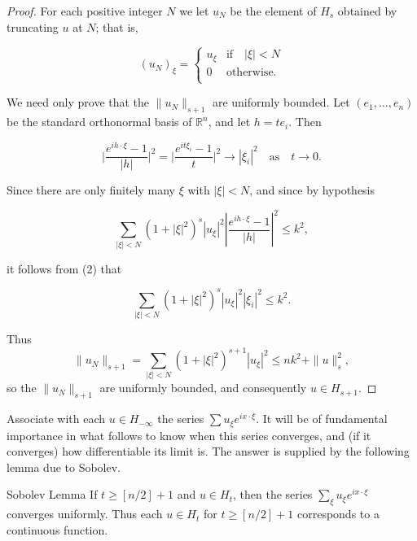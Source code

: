 \begin{proof}
For each positive integer $N$ we let  $ u_{N} $ be the element of  $ H_{s} $ obtained by truncating $u$ at $N$; that is,

\begin{equation}
\tag{1}\label{eq:6.20:1}
(u_{N})_{\xi}=\left\{\begin{matrix}{u_{\xi}}&{\mathrm{if}\quad|\xi|<N}\\ {0}&{\mathrm{otherwise}.}\\ \end{matrix}\right.
\end{equation}

We need only prove that the  $ \|u_N\|_{s+1} $ are uniformly bounded. Let  $ (e_1, \ldots, e_n) $ be the standard orthonormal basis of  $ \mathbb{R}^n $, and let  $ h = te_i $. Then

\begin{equation}
\tag{2}\label{eq:6.20:2}
\bigg|\frac{e^{i h\cdot\xi}-1}{|h|}\bigg|^{2}=\bigg|\frac{e^{i t\xi_{i}}-1}{t}\bigg|^{2}\to|\xi_{i}|^{2}\quad\text{as}\quad t\to0.
\end{equation}

Since there are only finitely many  $ \xi $ with  $ |\xi| < N $, and since by hypothesis

\[
\sum_{|\xi|<N}(1+|\xi|^{2})^{s}\left|u_{\xi}\right|^{2}\left|\frac{e^{i h\cdot\xi}-1}{|h|}\right|^{2}\leq k^{2},
\]

it follows from (2) that

\[
\sum_{|\xi|<N}(1+|\xi|^{2})^{s}\left|u_{\xi}\right|^{2}|\xi_{i}|^{2}\leq k^{2}.
\]

Thus
\[
\|u_{N}\|_{s+1}=\sum_{|\xi|<N}(1+|\xi|^{2})^{s+1}|u_{\xi}|^{2}\leq nk^{2}+\|u\|_{s}^{2},
\]
so the  $ \|u_N\|_{s+1} $ are uniformly bounded, and consequently  $ u \in H_{s+1} $.
\end{proof}

\label{thm:6.21} Associate with each $u \in H_{-\infty}$ the series $\sum u_{\xi} e^{ix \cdot \xi}$. It will be of fundamental importance in what follows to know when this series converges, and (if it converges) how differentiable its limit is. The answer is supplied by the following lemma due to Sobolev.

\begin{lemma}{Sobolev Lemma}\label{thm:6.22}
If $t \geq [n/2] + 1$ and $u \in H_t$, then the series $\sum_{\xi} u_{\xi} e^{i x \cdot \xi}$ converges uniformly. Thus each $u \in H_t$ for $t \geq [n/2] + 1$ corresponds to a continuous function.
\end{lemma}


